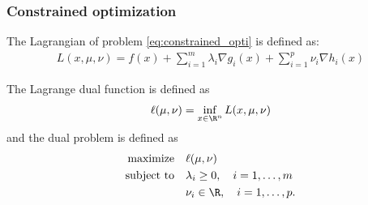 \documentclass{beamer}
\begin{document}
\begin{frame}[t]
\frametitle{Constrained optimization}
\vspace{-10pt}
\begin{definition} [Lagrangian]
The Lagrangian of problem \eqref{eq:constrained_opti} is defined as:
\vspace{-5pt}
\begin{align*}
L(x, \mu, \nu) = f(x) + \sum_{i=1}^m \lambda_i \nabla g_i(x) + \sum_{i=1}^p \nu_i \nabla h_i(x) 
\end{align*}
\vspace{-5pt}
\end{definition}
\vspace{-5pt}
\begin{definition} 
The Lagrange dual function is defined as 
\vspace{-5pt}
\begin{align*}
\ell(\mu,\nu) = \inf_{x \in \R^n} L(x, \mu, \nu)
\end{align*}
\vspace{-5pt}
and the dual problem is defined as
\vspace{-5pt}
\begin{align} 
\begin{split} \label{eq:dual}
\text{maximize} \quad &\ell(\mu,\nu) \\
\text{subject to} \quad &\lambda_i \geq 0, \quad i = 1, \dots, m \\
                            &\nu_i \in \R, \quad i = 1, \dots, p.
\end{split}                            
\end{align}
\vspace{-5pt}
\end{definition}
\end{frame}
\end{document}
